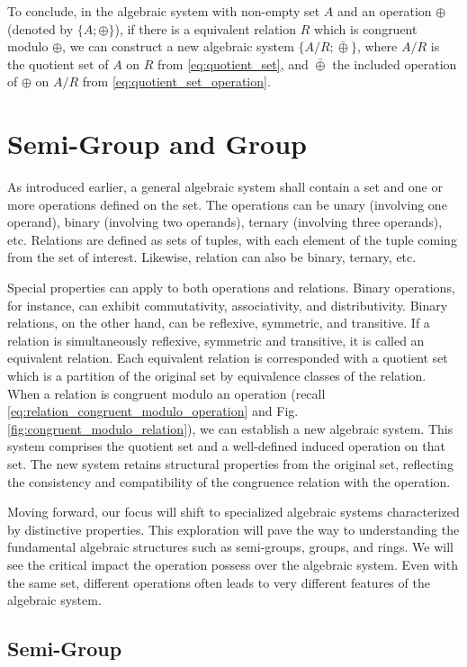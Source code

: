 To conclude, in the algebraic system with non-empty set $A$ and an operation $\oplus$ (denoted by $\{A; \oplus\}$), if there is a equivalent relation $R$ which is congruent modulo $\oplus$, we can construct a new algebraic system $\{A/R; \bar{\oplus}\}$, where $A/R$ is the quotient set of $A$ on $R$ from \eqref{eq:quotient_set}, and $\bar{\oplus}$ the included operation of $\oplus$ on $A/R$ from \eqref{eq:quotient_set_operation}.

\section{Semi-Group and Group}

As introduced earlier, a general algebraic system shall contain a set and one or more operations defined on the set. The operations can be unary (involving one operand), binary (involving two operands), ternary (involving three operands), etc. Relations are defined as sets of tuples, with each element of the tuple coming from the set of interest. Likewise, relation can also be binary, ternary, etc.

Special properties can apply to both operations and relations. Binary operations, for instance, can exhibit commutativity, associativity, and distributivity. Binary relations, on the other hand, can be reflexive, symmetric, and transitive.  If a relation is simultaneously reflexive, symmetric and transitive, it is called an equivalent relation. Each equivalent relation is corresponded with a quotient set which is a partition of the original set by equivalence classes of the relation. When a relation is congruent modulo an operation (recall \eqref{eq:relation_congruent_modulo_operation} and Fig. \ref{fig:congruent_modulo_relation}), we can establish a new algebraic system. This system comprises the quotient set and a well-defined induced operation on that set. The new system retains structural properties from the original set, reflecting the consistency and compatibility of the congruence relation with the operation.

Moving forward, our focus will shift to specialized algebraic systems characterized by distinctive properties. This exploration will pave the way to understanding the fundamental algebraic structures such as semi-groups, groups, and rings. We will see the critical impact the operation possess over the algebraic system. Even with the same set, different operations often leads to very different features of the algebraic system.

\subsection{Semi-Group}

